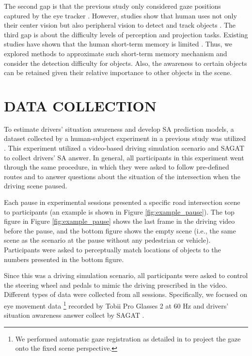 \documentclass[letterpaper, 10 pt, conference]{ieeeconf}  %
\begin{document}
The second gap is that the previous study only considered gaze positions captured by the eye tracker \cite{lu2017much, sharma2016eye}. However, studies show that human uses not only their center vision but also peripheral vision to detect and track objects \cite{iwasaki1986relation, foley2019sensation}. The third gap is about the difficulty levels of perception and projection tasks. Existing studies have shown that the human short-term memory is limited \cite{miller1956magical, broadbent1975magic, chase1973perception}. Thus, we explored methods to approximate such short-term memory mechanism and consider the detection difficulty for objects. Also, the awareness to certain objects can be retained given their relative importance to other objects in the scene.


\section{DATA COLLECTION}

To estimate drivers' situation awareness and develop SA prediction models, a dataset collected by a human-subject experiment in a previous study was utilized \cite{kim2020toward}. This experiment utilized a video-based driving simulation scenario and SAGAT to collect drivers' SA answer. In general, all participants in this experiment went through the same procedure, in which they were asked to follow pre-defined routes and to answer questions about the situation of the intersection when the driving scene paused.

Each pause in experimental sessions presented a specific road intersection scene to participants (an example is shown in Figure \ref{fig:example_pause}). The top figure in Figure \ref{fig:example_pause} shows the last frame in the driving video before the pause, and the bottom figure shows the empty scene (i.e., the same scene as the scenario at the pause without any pedestrian or vehicle). Participants were asked to perceptually match locations of objects to the numbers presented in the bottom figure.

Since this was a driving simulation scenario, all participants were asked to control the steering wheel and pedals to mimic the driving prescribed in the video. Different types of data were collected from all sessions. Specifically, we focused on eye movement data \footnote{We performed automatic gaze registration as detailed in \cite{martin2018dynamics} to project the gaze onto the fixed scene perspective.} recorded by Tobii Pro Glasses 2 at 60 Hz and drivers' situation awareness answer collect by SAGAT \cite{kim2019assessing}.
\end{document}
